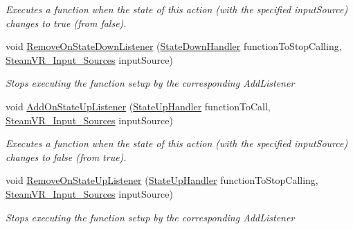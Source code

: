 \begin{DoxyCompactItemize}
\begin{DoxyCompactList}\small\item\em Executes a function when the state of this action (with the specified input\+Source) changes to true (from false). \end{DoxyCompactList}\item 
void \mbox{\hyperlink{class_valve_1_1_v_r_1_1_steam_v_r___action___boolean_af49585bef4b30cf01b02b65a31da5ea5}{Remove\+On\+State\+Down\+Listener}} (\mbox{\hyperlink{class_valve_1_1_v_r_1_1_steam_v_r___action___boolean_a529f46e4f0459edb2641bbb382d10614}{State\+Down\+Handler}} function\+To\+Stop\+Calling, \mbox{\hyperlink{namespace_valve_1_1_v_r_a82e5bf501cc3aa155444ee3f0662853f}{Steam\+V\+R\+\_\+\+Input\+\_\+\+Sources}} input\+Source)
\begin{DoxyCompactList}\small\item\em Stops executing the function setup by the corresponding Add\+Listener \end{DoxyCompactList}\item 
void \mbox{\hyperlink{class_valve_1_1_v_r_1_1_steam_v_r___action___boolean_a50f2be0b97d5631bb06a7d1d2dad86d1}{Add\+On\+State\+Up\+Listener}} (\mbox{\hyperlink{class_valve_1_1_v_r_1_1_steam_v_r___action___boolean_a87ebada25dac6016557c3b81e6324b90}{State\+Up\+Handler}} function\+To\+Call, \mbox{\hyperlink{namespace_valve_1_1_v_r_a82e5bf501cc3aa155444ee3f0662853f}{Steam\+V\+R\+\_\+\+Input\+\_\+\+Sources}} input\+Source)
\begin{DoxyCompactList}\small\item\em Executes a function when the state of this action (with the specified input\+Source) changes to false (from true). \end{DoxyCompactList}\item 
void \mbox{\hyperlink{class_valve_1_1_v_r_1_1_steam_v_r___action___boolean_a4d1c65c46143ef782e438f4d80150efc}{Remove\+On\+State\+Up\+Listener}} (\mbox{\hyperlink{class_valve_1_1_v_r_1_1_steam_v_r___action___boolean_a87ebada25dac6016557c3b81e6324b90}{State\+Up\+Handler}} function\+To\+Stop\+Calling, \mbox{\hyperlink{namespace_valve_1_1_v_r_a82e5bf501cc3aa155444ee3f0662853f}{Steam\+V\+R\+\_\+\+Input\+\_\+\+Sources}} input\+Source)
\begin{DoxyCompactList}\small\item\em Stops executing the function setup by the corresponding Add\+Listener \end{DoxyCompactList}\end{DoxyCompactItemize}
